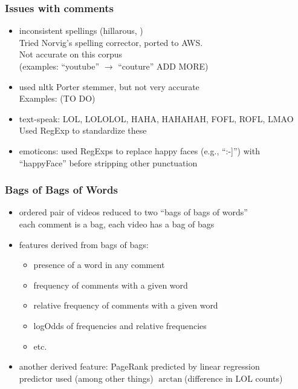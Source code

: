 \documentclass[fleqn]{beamer}
\begin{document}
\begin{frame}
\frametitle{Issues with comments}
    \begin{itemize}
        \item inconsistent spellings (hillarous, \textellipsis)\\
                Tried Norvig's spelling corrector, ported to AWS. \\
                Not accurate on this corpus\\
                  (examples: ``youtube'' $\rightarrow$ ``couture'' ADD MORE)

        \item used nltk Porter stemmer, but not very accurate\\
                   Examples: (TO DO)

        \item text-speak:  LOL, LOLOLOL, HAHA, HAHAHAH, FOFL, ROFL, LMAO\\
                 Used RegExp to standardize these

        \item emoticons: used RegExps to replace happy faces (e.g., ``:-]'') with ``happyFace'' 
                  before stripping other punctuation

    \end{itemize}
\end{frame}

\begin{frame}
\frametitle{Bags of Bags of Words}
     \begin{itemize}
         \item ordered pair of videos reduced to two ``bags of bags of words''  \\
                  each comment is a bag, each video has a bag of bags

         \item features derived from bags of bags:
             \begin{itemize}
                 \item presence of a word in any comment
                 \item frequency of comments with a given word
                 \item relative frequency of comments with a given word
                 \item  logOdds of frequencies and relative frequencies
                 \item etc.
              \end{itemize}
         
         \item another derived feature: PageRank predicted by linear regression\\ 
                  predictor used (among other things) $\arctan$(difference in LOL counts)
     
     \end{itemize}
\end{frame}
\end{document}
